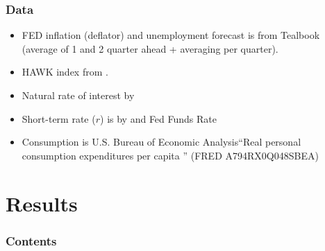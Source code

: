 \documentclass[11pt,pdf,aspectratio=129]{beamer}
\begin{document}
\begin{frame}\frametitle{Data}
\begin{itemize}\setlength\itemsep{1em}
    \item FED inflation (deflator) and unemployment forecast is from Tealbook (average of 1 and 2 quarter ahead + averaging per quarter).
    \item HAWK index from \citet{HIM2023}.
    \item Natural rate of interest by \citet{HLW2017,HLW2023}
    \item Short-term rate ($r$) is by \citet{WuXia2016} and Fed Funds Rate 
    \item Consumption is U.S. Bureau of Economic Analysis``Real personal consumption expenditures per capita ''  (FRED A794RX0Q048SBEA)
    \end{itemize}
\end{frame}

    




\section{Results}
\begin{frame}
    \frametitle{Contents}
    \tableofcontents[currentsection]
\end{frame}
\end{document}
